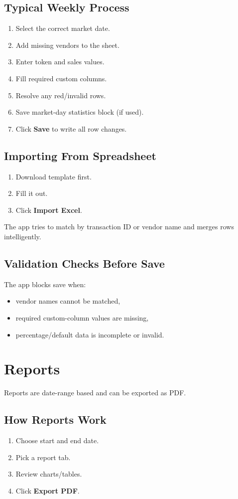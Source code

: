 \documentclass[11pt]{article}
\begin{document}
\subsection{Typical Weekly Process}
\begin{enumerate}
  \item Select the correct market date.
  \item Add missing vendors to the sheet.
  \item Enter token and sales values.
  \item Fill required custom columns.
  \item Resolve any red/invalid rows.
  \item Save market-day statistics block (if used).
  \item Click \textbf{Save} to write all row changes.
\end{enumerate}

\subsection{Importing From Spreadsheet}
\begin{enumerate}
  \item Download template first.
  \item Fill it out.
  \item Click \textbf{Import Excel}.
\end{enumerate}

The app tries to match by transaction ID or vendor name and merges rows intelligently.

\subsection{Validation Checks Before Save}
The app blocks save when:
\begin{itemize}
  \item vendor names cannot be matched,
  \item required custom-column values are missing,
  \item percentage/default data is incomplete or invalid.
\end{itemize}

\section{Reports}
Reports are date-range based and can be exported as PDF.

\subsection{How Reports Work}
\begin{enumerate}
  \item Choose start and end date.
  \item Pick a report tab.
  \item Review charts/tables.
  \item Click \textbf{Export PDF}.
\end{enumerate}
\end{document}
